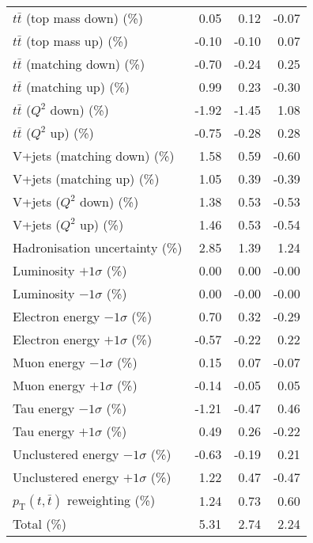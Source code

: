 \begin{table}[htbp]
{\begin{tabular}{lrrr}
$t\bar{t}$ (top mass down) (\%) & 0.05 & 0.12 & -0.07 \\ 
$t\bar{t}$ (top mass up) (\%) & -0.10 & -0.10 & 0.07 \\ 
$t\bar{t}$ (matching down) (\%) & -0.70 & -0.24 & 0.25 \\ 
$t\bar{t}$ (matching up) (\%) & 0.99 & 0.23 & -0.30 \\ 
$t\bar{t}$ ($Q^{2}$ down) (\%) & -1.92 & -1.45 & 1.08 \\ 
$t\bar{t}$ ($Q^{2}$ up) (\%) & -0.75 & -0.28 & 0.28 \\ 
V+jets (matching down) (\%) & 1.58 & 0.59 & -0.60 \\ 
V+jets (matching up) (\%) & 1.05 & 0.39 & -0.39 \\ 
V+jets ($Q^{2}$ down) (\%) & 1.38 & 0.53 & -0.53 \\ 
V+jets ($Q^{2}$ up) (\%) & 1.46 & 0.53 & -0.54 \\ 
Hadronisation uncertainty (\%) & 2.85 & 1.39 & 1.24 \\ 
Luminosity $+1\sigma$ (\%) & 0.00 & 0.00 & -0.00 \\ 
Luminosity $-1\sigma$ (\%) & 0.00 & -0.00 & -0.00 \\ 
Electron energy $-1\sigma$ (\%) & 0.70 & 0.32 & -0.29 \\ 
Electron energy $+1\sigma$ (\%) & -0.57 & -0.22 & 0.22 \\ 
Muon energy $-1\sigma$ (\%) & 0.15 & 0.07 & -0.07 \\ 
Muon energy $+1\sigma$ (\%) & -0.14 & -0.05 & 0.05 \\ 
Tau energy $-1\sigma$ (\%) & -1.21 & -0.47 & 0.46 \\ 
Tau energy $+1\sigma$ (\%) & 0.49 & 0.26 & -0.22 \\ 
Unclustered energy $-1\sigma$ (\%) & -0.63 & -0.19 & 0.21 \\ 
Unclustered energy $+1\sigma$ (\%) & 1.22 & 0.47 & -0.47 \\ 
$p_\mathrm{T}(t,\bar{t})$ reweighting (\%) & 1.24 & 0.73 & 0.60 \\ 
\hline 
Total (\%) & 5.31  & 2.74  & 2.24 \\ 
\hline 
\end{tabular}
}
\end{table}
